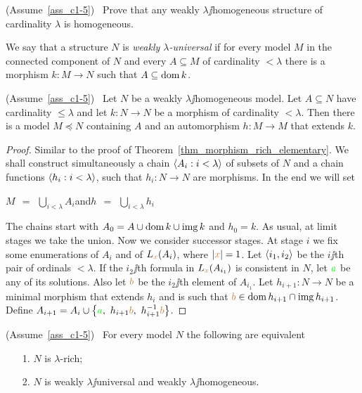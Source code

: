 \documentclass[creche.tex]{subfiles}
\begin{document}
\begin{exercise}\label{omogeneo=debolmenteaomogeneo}
(Assume~\ref{ass_c1-5}) \ Prove that any weakly $\lambda\jj$ho\-mo\-ge\-ne\-ous structure of cardinality $\lambda$ is homogeneous.\QED
\end{exercise}

\begin{definition}\label{def_weakly_universal}
We say that a structure $N$ is \emph{weakly $\lambda$-universal\/} if for every model $M$ in the connected component of $N$ and every $A\subseteq M$ of cardinality $<\lambda$ there is a morphism $k:M\to N$ such that $A\subseteq\mathop{\rm dom} k$.\QED
\end{definition}

\begin{lemma}\label{debolmenteomogeneoandirivieni}
(Assume~\ref{ass_c1-5})  \  Let $N$ be a weakly $\lambda\jj$ho\-mo\-ge\-ne\-ous model. Let $A\subseteq N$ have cardinality $\le\lambda$ and let $k:N\to N$ be a morphism of cardinality $<\lambda$. Then there is a model  $M\preceq N$ containing $A$ and an automorphism $h:M\to M$ that extends $k$.
\end{lemma}

\begin{proof}
Similar to the proof of Theorem~\ref{thm_morphism_rich_elementary}. We shall construct simultaneously a chain $\langle A_i:i<\lambda\rangle$ of subsets of $N$ and a chain functions $\langle h_i:i<\lambda\rangle$, such that $h_i:N\to N$ are morphisms. In the end we will set

\hfil $\displaystyle M\ \ =\ \ \bigcup_{i<\lambda}A_i$\hfil  and\hfil  $\displaystyle h\ \ =\ \ \bigcup_{i<\lambda}h_i$ 

The chains start with $A_0=A\cup\mathop{\rm dom} k\cup\mathop{\rm img} k$ and $h_0=k$. As usual, at limit stages we take the union. Now we consider successor stages. At stage $i$ we fix some enumerations of $A_i$ and of $L_{\color{brown} x}(A_i)$, where $|{\color{brown} x}|=1$. Let $\langle i_1,i_2\rangle$ be the $i\jj$th pair of ordinals $<\lambda$. If the $i_2\jj$th formula in $L_{\color{brown} x}(A_{i_1})$ is consistent in $N$, let ${\color{green} a}$ be any of its solutions. Also let ${\color{brown} b}$ be the $i_2\jj$th element of $A_{i_1}$. Let $h_{i+1}:N\to N$ be a minimal morphism that extends $h_i$ and is such that ${\color{brown} b}\in\mathop{\rm dom} h_{i+1}\cap\mathop{\rm img} h_{i+1}$. Define $A_{i+1}=A_i\cup\big\{{\color{green} a},\ h_{i+1}{\color{brown} b},\  h_{i+1}^{-1}{\color{brown} b}\big\}$.
\end{proof}

\begin{theorem}\label{ricco=universaledebolmenteomogeneo}
(Assume~\ref{ass_c1-5})  \  For every model $N$ the following are equivalent
\begin{itemize}
\item[1.] $N$ is $\lambda$-rich;
\item[2.] $N$ is  weakly $\lambda\jj$universal and weakly $\lambda\jj$homogeneous.
\end{itemize}
\end{theorem}
\end{document}
